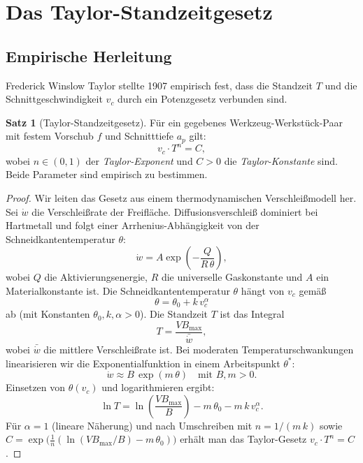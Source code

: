 ﻿\documentclass[a4paper,12pt]{article}
\theoremstyle{definition}
\newtheorem{satz}{Satz}
\begin{document}
\section{Das Taylor-Standzeitgesetz}
\label{sec:standzeit}

\subsection{Empirische Herleitung}

Frederick Winslow Taylor stellte 1907 empirisch fest, dass die Standzeit $T$
und die Schnittgeschwindigkeit $v_c$ durch ein Potenzgesetz verbunden sind.

\begin{satz}[Taylor-Standzeitgesetz]
\label{satz:taylor}
  Für ein gegebenes Werkzeug-Werkstück-Paar mit festem Vorschub $f$ und
  Schnitttiefe $a_p$ gilt:
  \[
    v_c \cdot T^n = C,
  \]
  wobei $n \in (0, 1)$ der \emph{Taylor-Exponent} und $C > 0$ die
  \emph{Taylor-Konstante} sind. Beide Parameter sind empirisch zu bestimmen.
\end{satz}

\begin{proof}
  Wir leiten das Gesetz aus einem thermodynamischen Verschleißmodell her.
  Sei $\dot{w}$ die Verschleißrate der Freifläche. Diffusionsverschleiß dominiert
  bei Hartmetall und folgt einer Arrhenius-Abhängigkeit von der Schneidkantentemperatur
  $\theta$:
  \[
    \dot{w} = A \exp\!\left(-\frac{Q}{R\,\theta}\right),
  \]
  wobei $Q$ die Aktivierungsenergie, $R$ die universelle Gaskonstante und $A$
  ein Materialkonstante ist. Die Schneidkantentemperatur $\theta$ hängt von $v_c$
  gemäß
  \[
    \theta = \theta_0 + k \, v_c^{\alpha}
  \]
  ab (mit Konstanten $\theta_0, k, \alpha > 0$). Die Standzeit $T$ ist das Integral
  \[
    T = \frac{VB_{\max}}{\bar{\dot{w}}},
  \]
  wobei $\bar{\dot{w}}$ die mittlere Verschleißrate ist. Bei moderaten
  Temperaturschwankungen linearisieren wir die Exponentialfunktion in einem
  Arbeitspunkt $\theta^*$:
  \[
    \dot{w} \approx B \, \exp(m \, \theta) \quad \text{mit } B, m > 0.
  \]
  Einsetzen von $\theta(v_c)$ und logarithmieren ergibt:
  \[
    \ln T = \ln\!\left(\frac{VB_{\max}}{B}\right) - m\,\theta_0 - m\,k\,v_c^{\alpha}.
  \]
  Für $\alpha = 1$ (lineare Näherung) und nach Umschreiben mit
  $n = 1/(m\,k)$ sowie $C = \exp\!\bigl(\tfrac{1}{n}(\ln(VB_{\max}/B) - m\,\theta_0)\bigr)$
  erhält man das Taylor-Gesetz $v_c \cdot T^n = C$. \qedhere
\end{proof}
\end{document}

